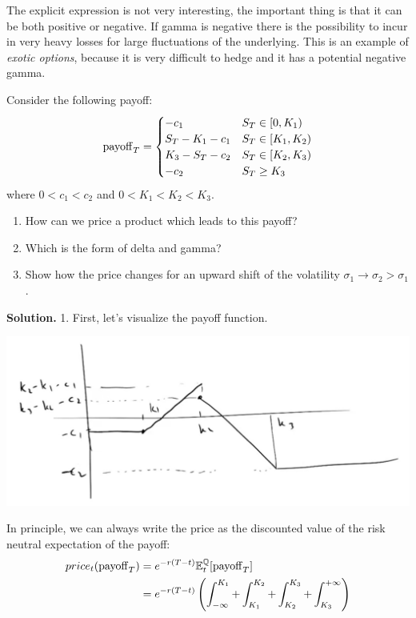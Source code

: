 The explicit expression is not very interesting, the important thing is that it can be both positive or negative. If gamma is negative there is the possibility to incur in very heavy losses for large fluctuations of the underlying. This is an example of \emph{exotic options}, because it is very difficult to hedge and it has a potential negative gamma.
\begin{example}{}{}{}
    Consider the following payoff:
    \begin{equation}
        \operatorname{payoff}_T = \begin{cases}
        -c_1 & S_T \in [0,K_1) \\
        S_T - K_1 - c_1 & S_T \in [K_1,K_2) \\
        K_3 - S_T - c_2 & S_T \in [K_2,K_3) \\
        -c_2 & S_T \ge K_3
        \end{cases}
    \end{equation}
    where $0<c_1<c_2$ and $0<K_1<K_2<K_3$. 
    \begin{enumerate}
        \item How can we price a product which leads to this payoff?
        \item Which is the form of delta and gamma?
        \item Show how the price changes for an upward shift of the volatility $\sigma_1\to\sigma_2>\sigma_1$.
    \end{enumerate}
    \textbf{Solution.} 1. First, let's visualize the payoff function.
    \begin{center}
        \includegraphics[scale=0.3]{fig/tmp/fig28.png}
    \end{center}
    In principle, we can always write the price as the discounted value of the risk neutral expectation of the payoff:
    \begin{align}
        \notag price_t(\pay_T) &= e^{-r(T-t)}\expect_t[\pay_T] \\
        &=
        e^{-r(T-t)}\left(\int_{-\infty}^{K_1}+\int_{K_1}^{K_2}+\int_{K_2}^{K_3}+\int_{K_3}^{+\infty}\right)

\end{align}
\end{example}
